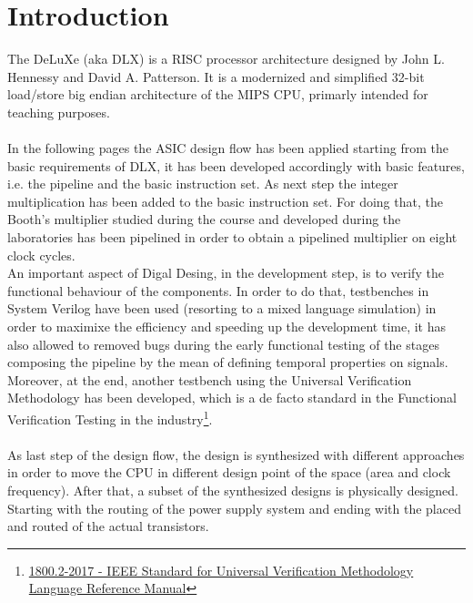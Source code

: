 \chapter{Introduction}
\label{Introduction}
The DeLuXe (aka DLX) is a RISC processor architecture designed by John L. Hennessy and David A. Patterson. It is a modernized and simplified  32-bit load/store big endian architecture of the MIPS CPU, primarly intended for teaching purposes.\\\\
In the following pages the ASIC design flow has been applied starting from the basic requirements of DLX, it has been developed accordingly with basic features, i.e. the pipeline and the basic instruction set.
As next step the integer multiplication has been added to the basic instruction set. For doing that, the Booth's multiplier studied during the course and developed during the laboratories has been pipelined in order to obtain a pipelined multiplier on eight clock cycles.\\
An important aspect of Digal Desing, in the development step, is to verify the functional behaviour of the components. In order to do that, testbenches in System Verilog have been used (resorting to a mixed language simulation) in order to maximixe the efficiency and speeding up the development time, it has also allowed to removed bugs during the early functional testing of the stages composing the pipeline  by the mean of defining temporal properties on signals.
Moreover, at the end, another testbench using the Universal Verification Methodology has been developed, which is a de facto standard in the Functional Verification Testing in the industry\footnote{\href{https://standards.ieee.org/standard/1800_2-2017.html}{1800.2-2017 - IEEE Standard for Universal Verification Methodology Language Reference Manual}}.\\\\
As last step of the design flow, the design is synthesized with different approaches in order to move the CPU in different design point of the space (area and clock frequency). After that, a subset of the synthesized designs is physically designed. Starting with the routing of the power supply system and ending with the placed and routed of the actual transistors.